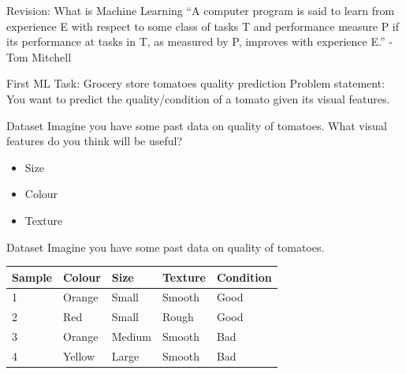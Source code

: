 \documentclass[usenames,dvipsnames]{beamer}
\begin{document}
\begin{frame}{Revision: What is Machine Learning}
``A computer program is said to learn from
experience E with respect to some class of tasks T
and performance measure P if its performance at
tasks in T, as measured by P, improves with
experience E.'' - Tom Mitchell
\end{frame}

\begin{frame}{First ML Task: Grocery store tomatoes quality prediction}
Problem statement: You want to predict the quality/condition of a tomato given its visual features.
\end{frame}

\begin{frame}{Dataset}
Imagine you have some past data on quality of tomatoes. What visual features do you think will be useful?

\begin{itemize}
	\item \pause Size
	\item \pause Colour
	\item \pause Texture
\end{itemize}
\end{frame}
  
\begin{frame}{Dataset}
Imagine you have some past data on quality of tomatoes. 

\begin{table}[]
	\begin{tabular}{|l|l|l|l||l|}
		\hline 
		\textbf{Sample} & \textbf{Colour} & \textbf{Size} & \textbf{Texture} & \textbf{Condition} \\ \hline 
		1      & Orange & Small & Smooth  & Good      \\
		2      & Red    & Small  & Rough  & Good \\
		3      & Orange & Medium & Smooth & Bad \\
		4      & Yellow & Large  & Smooth & Bad \\ \hline          
	\end{tabular}
\end{table}
\end{frame}
\end{document}

